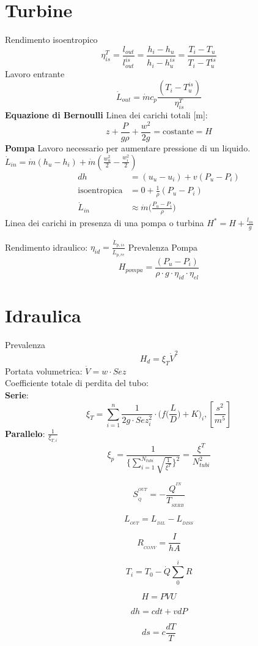 \documentclass[landscape,a4paper]{article}
\begin{document}
\begin{multicols}{4}
\section*{Turbine}
Rendimento isoentropico
\[ \eta_{is}^T = \frac{l_{out}}{l_{out}^{is}} = \frac{h_i - h_u}{h_i - h_{u}^{is}} =  \frac{T_i - T_u}{T_i - T_{u}^{is}}\]
Lavoro entrante
\[ \dot L_{out} = \dot m c_p \frac{(T_i - T_u^{is})}{\eta_{is}^T} \]
\textbf{Equazione di Bernoulli}
Linea dei carichi totali [m]:
\[ z + \frac{P}{g\rho} + \frac{w^2}{2g} = \text{costante} = H\]
\textbf{Pompa}
Lavoro necessario per aumentare pressione di un liquido.\\
$\dot{L}_{in} = \dot{m} (h_u - h_i) + \dot{m} (\frac{w_u^2}{2}-\frac{w_i^2}{2})$
\begin{align*}
dh &= (u_u-u_i)+v(P_u - P_i) \\
\text{isoentropica} &= 0 + \frac{1}{\rho}(P_u - P_i) \\
\dot{L}_{in} &\approx \dot{m} \Big(\frac{P_u - P_i}{\rho}\Big)
\end{align*}
Linea dei carichi in presenza di una pompa o turbina \(H^* = H + \frac{l_{in}}{g}\)

Rendimento idraulico: \(\eta_{id} = \frac{\dot{L}_{p,is}}{\dot{L}_{p,re}}\)
Prevalenza Pompa
\[H_{pompa} = \frac{(P_u-P_i)}{\rho \cdot g\cdot \eta_{id}\cdot \eta_{el}}\]


\section*{Idraulica}
Prevalenza
\[H_d = \xi_T \dot{V}^2\]
Portata volumetrica: \(\dot{V}=w\cdot Sez\) \\
Coefficiente totale di perdita del tubo:\\
\textbf{Serie}:
\[\xi_T = \sum_{i=1}^{n}\frac{1}{2g\cdot Sez_i^2} \cdot \Big( f \Big( \frac{L}{D} \Big) +K \Big)_i, [\frac{s^2}{m^5}]\]
\textbf{Parallelo}: \(\frac{1}{\xi_{T,i}}\)
\[
\xi_p = \frac{1}{\{\sum_{i=1}^{N_{tubi}}\sqrt{\frac{1}{\xi^T}}\}^2} = \frac{\xi^T}{N_{tubi}^2}
\] 


\[ S_{_Q}^{^{OUT}}= - \frac{Q^{^{IN}}}{T_{_{SERB}}} \]

\[L_{_{OUT}}= L_{_{DIL}}- L_{_{DISS}} \]




\[ R_{_{CONV}} =\frac{I}{hA}\]
	




\[ T_{i} = T_{0} - \dot Q \sum _{0}^{i} R \]	






\[ H = PVU \]

\[ dh = cdt + vdP \]
	
\[ds= c \frac{dT}{T}\]




\end{multicols}
\end{document}
